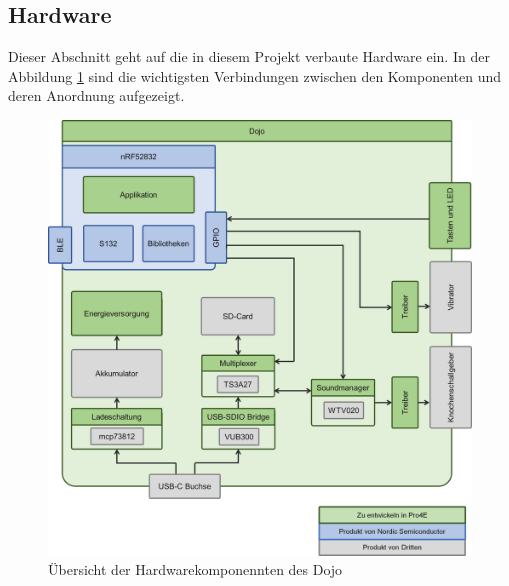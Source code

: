 \documentclass[10pt,a4paper,oneside]{99_fhnwreport}
\begin{document}
\newpage

\subsection{Hardware} \label{sec:hardware}

Dieser Abschnitt geht auf die in diesem Projekt verbaute Hardware ein. In der Abbildung \ref{fig:dojo} sind die wichtigsten Verbindungen zwischen den Komponenten und deren Anordnung aufgezeigt.

\begin{figure}[htb]
\includegraphics[width=\textwidth]{Dojo.png}
\caption{Übersicht der Hardwarekomponennten des Dojo} %
\label{fig:dojo}
\end{figure}
\end{document}
